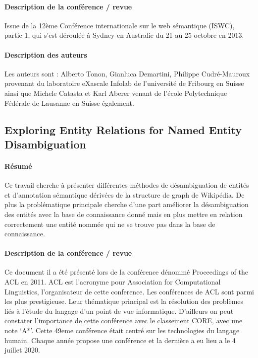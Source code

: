 \documentclass{article}
\begin{document}
\paragraph{Description de la conférence / revue}

Issue de la 12ème Conférence internationale sur le web sémantique (ISWC), partie 1, qui s’est déroulée à Sydney en Australie du 21 au 25 octobre en 2013.


\paragraph{Description des auteurs}

Les auteurs sont :
Alberto Tonon, Gianluca Demartini, Philippe Cudré-Mauroux provenant du laboratoire eXascale Infolab de l'université de Fribourg en Suisse ainsi que Michele Catasta et Karl Aberer venant de l'école Polytechnique Fédérale de Lausanne en Suisse également.

\subsection{Exploring Entity Relations for Named Entity Disambiguation \cite{article-13}}

\paragraph{Résumé}
Ce travail cherche à présenter différentes méthodes de désambiguation de entités et d’annotation sémantique dérivées de la structure de graph de Wikipédia. De plus la problématique principale cherche d’une part améliorer la désambiguation des entités avec la base de connaissance donné mais en plus mettre en relation correctement une entité nommée qui ne se trouve pas dans la base de connaissance.


\paragraph{Description de la conférence / revue}
Ce document il a été présenté lors de la conférence dénommé Proceedings of the ACL en 2011. ACL est l’acronyme pour Association for Computational Linguistics, l’organisateur de cette conference.
Les conférences de ACL sont parmi les plus prestigieuse. Leur thématique principal est la résolution des problèmes liés à l’étude du langage d’un point de vue informatique. 
D’ailleurs on peut constater l’importance de cette conférence avec le classement CORE, avec une note ‘A*’.
Cette 49eme conférence était centré sur les technologies du langage humain. Chaque année propose une conférence et la dernière a eu lieu a le 4 juillet 2020.
\end{document}
